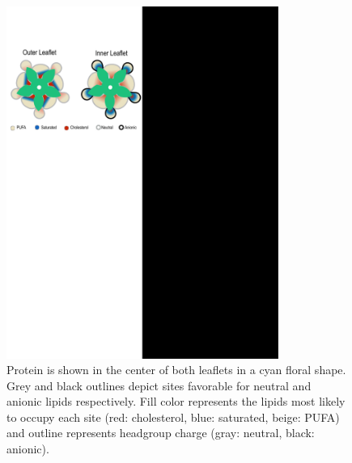 \begin{figure}
	\center
	\includegraphics[width=3.5in]{./Figures/Summary.pdf}
	\caption[Cartoon of expected boundary lipids for the \nachr~ in a native membrane for both leaflets.] {Protein is shown in the center of both leaflets in a cyan floral shape. Grey and black outlines depict sites favorable for neutral and anionic lipids respectively. Fill color represents the lipids most likely to occupy each site (red: cholesterol, blue: saturated, beige: PUFA) and outline represents headgroup charge (gray: neutral, black: anionic).}
	\label{fig:sum}
\end{figure}

